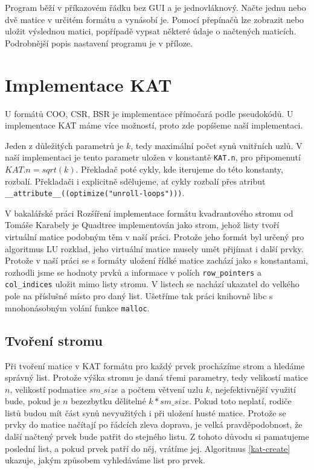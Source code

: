 Program běží v příkazovém řádku bez GUI a je jednovláknový. Načte jednu nebo dvě matice v určitém formátu a vynásobí je. Pomocí přepínačů lze zobrazit nebo uložit výslednou matici, popřípadě vypsat některé údaje o načtených maticích. Podrobnější popis nastavení programu je v příloze.


\section{Implementace KAT}

U formátů COO, CSR, BSR je implementace přímočará podle pseudokódů. U implementace KAT máme více možností, proto zde popíšeme naší implementaci.

Jeden z důležitých parametrů je $k$, tedy maximální počet synů vnitřních uzlů. V naší implementaci je tento parametr uložen v konstantě \texttt{KAT.n}, pro připomenutí $KAT.n = sqrt(k)$. Překladač poté cykly, kde iterujeme do této konstanty, rozbalí. Překladači i explicitně sdělujeme, ať cykly rozbalí přes atribut \texttt{\_\_attribute\_\_((optimize("unroll-loops")))}.

V bakalářské práci Rozšíření implementace formátu kvadrantového stromu od Tomáše Karabely \cite{karabela} je Quadtree implementován jako strom, jehož listy tvoří virtuální matice podobným těm v naší práci. Protože jeho formát byl určený pro algoritmus LU rozklad, jeho virtuální matice musely umět přijímat i další prvky. Protože v naší práci se s formáty uložení řídké matice zachází jako s konstantami, rozhodli jsme se hodnoty prvků a informace v polích \texttt{row\_pointers} a \texttt{col\_indices} uložit mimo listy stromu. V listech se nachází ukazatel do velkého pole na příslušné místo pro daný list. Ušetříme tak práci knihovně libc s mnohonásobným volání funkce \texttt{malloc}.

\subsection{Tvoření stromu}

Při tvoření matice v KAT formátu pro každý prvek procházíme strom a hledáme správný list. Protože výška stromu je daná třemi parametry, tedy velikostí matice $n$, velikostí podmatice $sm\_size$ a počtem větvení uzlu $k$, nejefektivnější využití bude, pokud je $n$ bezezbytku dělitelné $k * sm\_size$. Pokud toto neplatí, rodiče listů budou mít část synů nevyužitých i při uložení husté matice. Protože se prvky do matice načítají po řádcích zleva doprava, je velká pravděpodobnost, že další načtený prvek bude patřit do stejného listu. Z tohoto důvodu si pamatujeme poslední list, a pokud prvek patří do něj, vrátíme jej. Algoritmus \ref{kat-create} ukazuje, jakým způsobem vyhledáváme list pro prvek.


